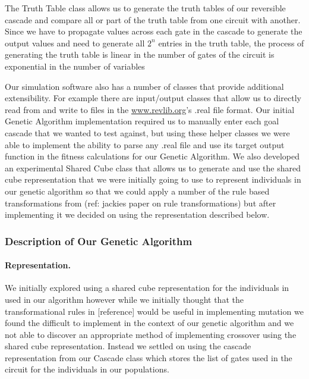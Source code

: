The Truth Table class allows us to generate the truth tables of our reversible cascade and compare all or part of the truth 
table from one circuit with another. Since we have to propagate values across each gate in the cascade to generate the output 
values and need to generate all \(2^{n}\) entries in the truth table, the process of generating the truth table is linear in the 
number of gates of the circuit is exponential in the number of variables 

Our simulation software also has a number of classes that provide additional extensibility. For example there are input/output 
classes that allow us to directly read from and write to files in the \url{www.revlib.org}'s .real file format. Our initial Genetic Algorithm implementation 
required us to manually enter each goal cascade that we wanted to test against, but using these helper classes we were able to 
implement the ability to parse any .real file and use its target output function in the fitness calculations for our Genetic 
Algorithm. We also developed an experimental Shared Cube class that allows us to generate and use the shared cube 
representation that we were initially going to use to represent individuals in our genetic algorithm so that we could apply a 
number of the rule based transformations from (ref: jackies paper on rule transformations) but after implementing it we decided 
on using the representation described below. 

  \subsubsection{Description of Our Genetic Algorithm}

\paragraph{Representation.} 

We initially explored using a shared cube representation for the individuals in used in our algorithm however while we initially 
thought that the transformational rules  in [reference] would be useful in implementing mutation we found the difficult to implement 
in the context of our genetic algorithm and we not able to discover an appropriate method of implementing crossover using the shared 
cube representation. Instead we settled on using the cascade representation from our Cascade class which stores the list of gates used 
in the circuit for the individuals in our populations.

